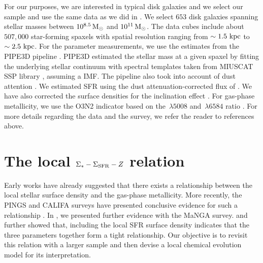 \documentclass[12pt, appendixfloats, numberedappendix]{emulateapj}
\begin{document}
For our purposes, we are interested in typical disk galaxies and we select our sample and use the same data as we did
in \citet{barrera16a}. We select $653$ disk galaxies spanning stellar masses between $10^{8.5}\,\rm M_\odot$ and
$10^{11}\,\rm M_\odot$. The data cubes include about $507,000$ star-forming spaxels with spatial resolution ranging 
from $\sim1.5\,{\rm\,kpc}$ to $\sim2.5\,{\rm\,kpc}$.
For the parameter measurements, we use the estimates from the PIPE3D pipeline \citep{sanchez16a}.
PIPE3D estimated the stellar mass at a given spaxel by fitting the underlying stellar continuum with spectral templates taken 
from MIUSCAT SSP library \citep[][]{vazdekis12a}, assuming a \citet{salpeter55a} IMF. 
The pipeline also took into account of dust attention \citep[][]{calzetti01a}.
We estimated SFR using the dust attenuation-corrected flux of \ha. 
We have also corrected the surface densities for the inclination effect \citep[see][]{barrera16a}.
For gas-phase metallicity, we use the O3N2 indicator based on the \oiii$\,\lambda5008$ and \nii$\,\lambda6584$ ratio \citep[\eg][]{marino13a}.
For more details regarding the data and the survey, we refer the reader to references above.

\section{The local $\Sigma_{*}-\Sigma_{\rm SFR}-Z$ relation}\label{sec:relation}

Early works \citep[\eg][]{edmunds84a, vilacostas92a} have already suggested that there exists a relationship between the local stellar surface density
and the gas-phase metallicity. More recently, the PINGS and CALIFA surveys have presented conclusive evidence for such a relationship \citep{rosales12a, sanchez13a}.
In \citet{barrera16a}, we presented further evidence with the MaNGA survey. 
\citet{rosales12a} and \citet{sanchez13a} further showed that, including the local SFR surface density indicates that the three parameters together form a tight relationship.
Our objective is to revisit this relation with a larger sample and then devise a local chemical evolution model for its interpretation.
\end{document}
